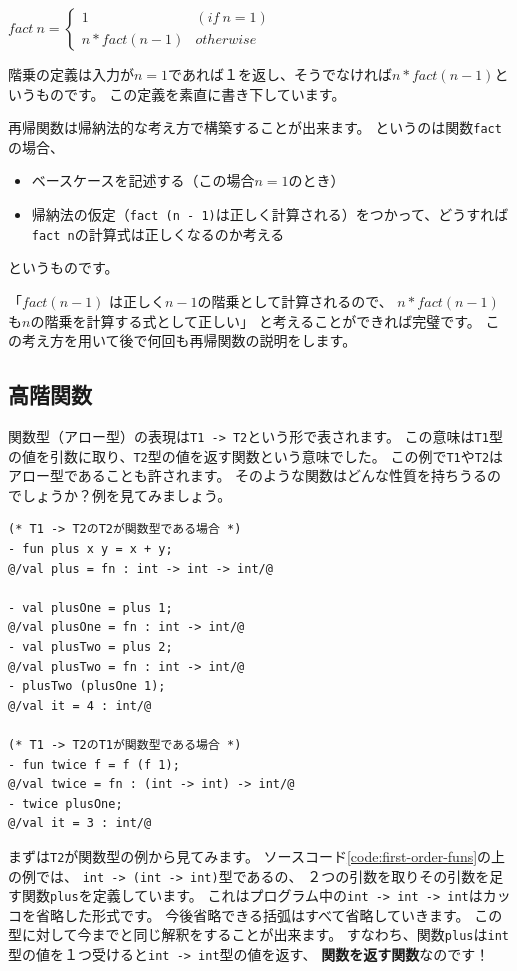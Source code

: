 \documentclass[11pt,a4paper]{article}
\begin{document}
$fact \ n = \begin{cases} 1 & (if \ n = 1) \\ n * fact (n - 1) & otherwise \end{cases}$

階乗の定義は入力が$n=1$であれば１を返し、そうでなければ$n * fact (n - 1)$というものです。
この定義を素直に書き下しています。

再帰関数は帰納法的な考え方で構築することが出来ます。
というのは関数\lstinline{fact}の場合、
\begin{itemize}
\item ベースケースを記述する（この場合$n=1$のとき）
\item 帰納法の仮定（\lstinline{fact (n - 1)}は正しく計算される）をつかって、どうすれば\lstinline{fact n}の計算式は正しくなるのか考える
\end{itemize}
というものです。

「$fact (n - 1)$ は正しく$n - 1$の階乗として計算されるので、
$n * fact (n - 1)$も$n$の階乗を計算する式として正しい」
と考えることができれば完璧です。
この考え方を用いて後で何回も再帰関数の説明をします。

\subsection{高階関数}
関数型（アロー型）の表現は\lstinline{T1 -> T2}という形で表されます。
この意味は\lstinline{T1}型の値を引数に取り、\lstinline{T2}型の値を返す関数という意味でした。
この例で\lstinline{T1}や\lstinline{T2}はアロー型であることも許されます。
そのような関数はどんな性質を持ちうるのでしょうか？例を見てみましょう。

\begin{lstlisting}[caption=第一級関数,label=code:first-order-funs]
(* T1 -> T2のT2が関数型である場合 *)
- fun plus x y = x + y;
@/val plus = fn : int -> int -> int/@

- val plusOne = plus 1;
@/val plusOne = fn : int -> int/@
- val plusTwo = plus 2;
@/val plusTwo = fn : int -> int/@
- plusTwo (plusOne 1);
@/val it = 4 : int/@

(* T1 -> T2のT1が関数型である場合 *)
- fun twice f = f (f 1);
@/val twice = fn : (int -> int) -> int/@
- twice plusOne;
@/val it = 3 : int/@
\end{lstlisting}

まずは\lstinline{T2}が関数型の例から見てみます。
ソースコード\ref{code:first-order-funs}の上の例では、
\lstinline{int -> (int -> int)}型であるの、
２つの引数を取りその引数を足す関数\lstinline{plus}を定義しています。
これはプログラム中の\lstinline{int -> int -> int}はカッコを省略した形式です。
今後省略できる括弧はすべて省略していきます。
この型に対して今までと同じ解釈をすることが出来ます。
すなわち、関数\lstinline{plus}は\lstinline{int}型の値を１つ受けると\lstinline{int -> int}型の値を返す、
{\bfseries 関数を返す関数}なのです！
\end{document}
